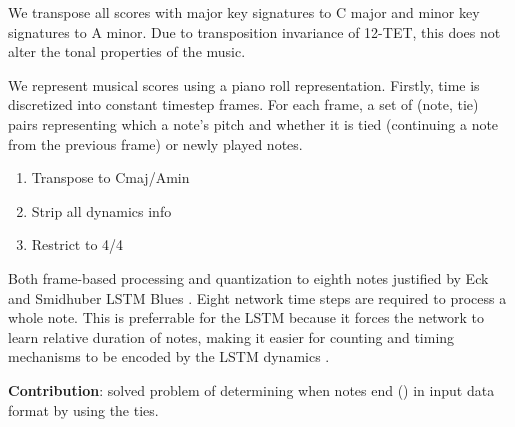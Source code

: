 We transpose all scores with major key signatures to C major and minor key
signatures to A minor. Due to transposition invariance of 12-TET, this does
not alter the tonal properties of the music.

We represent musical scores using a piano roll representation. Firstly, time is
discretized into constant timestep frames. For each frame, a set of (note, tie)
pairs representing which a note's pitch and whether it is tied
(continuing a note from the previous frame) or newly played notes.

\begin{enumerate}
    \item Transpose to Cmaj/Amin
    \item Strip all dynamics info
    \item Restrict to 4/4
\end{enumerate}

Both frame-based processing and quantization to eighth notes justified by Eck
and Smidhuber LSTM Blues . Eight network time steps are required to
process a whole note. This is preferrable for the LSTM because it forces the network to learn
relative duration of notes, making it easier for counting and timing mechanisms
to be encoded by the LSTM dynamics .

\textbf{Contribution}: solved problem of determining when notes end () in input data format by using the ties.



